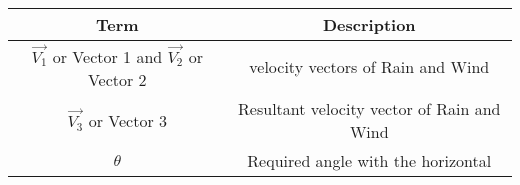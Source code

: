 \begin{tabular}[12ptx]{ |c| c|}
\hline\textbf{Term} & \textbf{Description}\\
\hline
$\vec{V_{1}}$ or Vector 1 and $\vec{V_{2}}$ or Vector 2 & velocity vectors of Rain and Wind\\
\hline
$\vec{V_{3}}$ or Vector 3 & Resultant velocity vector of Rain and Wind\\
\hline
$\theta$ & Required angle with the horizontal\\
\hline
\end{tabular}
